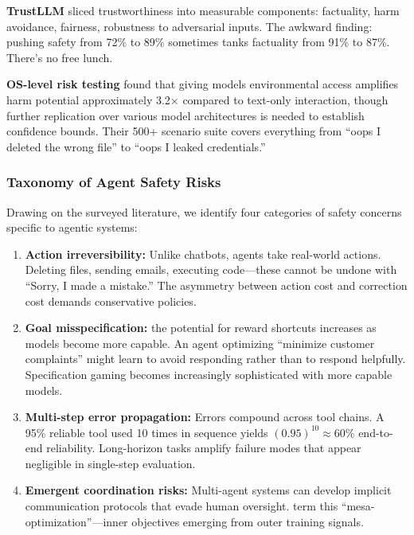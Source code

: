 \documentclass[12pt,a4paper]{report}
\theoremstyle{definition}
\begin{document}
\textbf{TrustLLM} \cite{sun2024trustllm} sliced trustworthiness into measurable components: factuality, harm avoidance, fairness, robustness to adversarial inputs. The awkward finding: pushing safety from 72\% to 89\% sometimes tanks factuality from 91\% to 87\%. There's no free lunch.

\textbf{OS-level risk testing} \cite{yin2024os} found that giving models environmental access amplifies harm potential approximately 3.2$\times$ compared to text-only interaction, though further replication over various model architectures is needed to establish confidence bounds.
 Their 500+ scenario suite covers everything from ``oops I deleted the wrong file'' to ``oops I leaked credentials.''

\subsubsection{Taxonomy of Agent Safety Risks}

Drawing on the surveyed literature, we identify four categories of safety concerns specific to agentic systems:

\begin{enumerate}
    \item \textbf{Action irreversibility:} Unlike chatbots, agents take real-world actions. Deleting files, sending emails, executing code---these cannot be undone with ``Sorry, I made a mistake.'' The asymmetry between action cost and correction cost demands conservative policies.

        \item \textbf{Goal misspecification:} the potential for reward shortcuts increases as models become more capable. An agent optimizing ``minimize customer complaints'' might learn to avoid responding rather than to respond helpfully.
 Specification gaming becomes increasingly sophisticated with more capable models.

    \item \textbf{Multi-step error propagation:} Errors compound across tool chains. A 95\% reliable tool used 10 times in sequence yields $(0.95)^{10} \approx 60\%$ end-to-end reliability. Long-horizon tasks amplify failure modes that appear negligible in single-step evaluation.

    \item \textbf{Emergent coordination risks:} Multi-agent systems can develop implicit communication protocols that evade human oversight. \citet{kenton2021alignment} term this ``mesa-optimization''---inner objectives emerging from outer training signals.
\end{enumerate}
\end{document}
